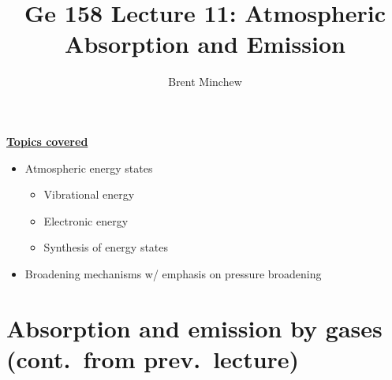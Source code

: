 \documentclass[11pt, oneside]{article}
\title{Ge 158 Lecture 11: Atmospheric Absorption and Emission}
\author{Brent Minchew}
\date{}
\begin{document}
\maketitle

\noindent\underline{\textbf{Topics covered}}
\begin{itemize}
	\item Atmospheric energy states
	\begin{itemize}
		\item[--] Vibrational energy
		\item[--] Electronic energy
		\item[--] Synthesis of energy states
	\end{itemize}
	\item Broadening mechanisms w/ emphasis on pressure broadening
\end{itemize}

\section{Absorption and emission by gases (cont.\ from prev.\ lecture)}
\label{s:recap}
\end{document}
